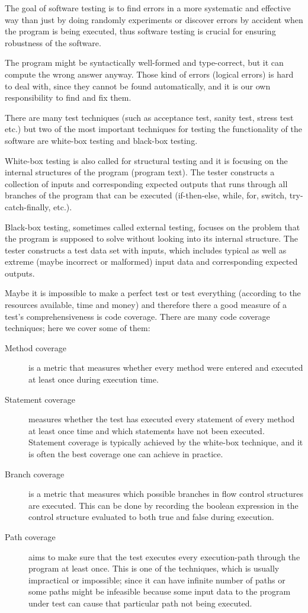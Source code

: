 \documentclass[10pt,a4paper]{article}
\begin{document}
The goal of software testing is to find errors in a more systematic and effective way than just by doing randomly experiments or discover errors by accident when the program is being executed, thus software testing is crucial for ensuring robustness of the software.
 
The program might be syntactically well-formed and type-correct, but it can compute the wrong answer anyway. Those kind of errors (logical errors) is hard to deal with, since they cannot be found automatically, and it is our own responsibility to find and fix them.

There are many test techniques (such as acceptance test, sanity test, stress test etc.) but two of the most important techniques for testing the functionality of the software are white-box testing and black-box testing.
 
White-box testing is also called for structural testing and it is focusing on the internal structures of the program (program text). The tester constructs a collection of inputs and corresponding expected outputs that runs through all branches of the program that can be executed (if-then-else, while, for, switch, try-catch-finally, etc.).
 
Black-box testing, sometimes called external testing, focuses on the problem that the program is supposed to solve without looking into its internal structure. The tester constructs a test data set with inputs, which includes typical as well as extreme (maybe incorrect or malformed) input data and corresponding expected outputs.
 
Maybe it is impossible to make a perfect test or test everything (according to the resources available, time and money) and therefore there a good measure of a test’s comprehensiveness is code coverage.
There are many code coverage techniques; here we cover some of them:

\begin{description}
 \item [Method coverage] is a metric that measures whether every method were entered and executed at least once during execution time.
 \item[Statement coverage] measures whether the test has executed every statement of every method at least once time and which statements have not been executed. Statement coverage is typically achieved by the white-box technique, and it is often the best coverage one can achieve in practice.
 \item [Branch coverage] is a metric that measures which possible branches in flow control structures are executed. This can be done by recording the boolean expression in the  control structure evaluated to both true and false during execution.
 \item[Path coverage] aims to make sure that the test executes every execution-path through the program at least once. This is one of the techniques, which is usually impractical or impossible; since it can have infinite number of paths or some paths might be infeasible because some input data to the program under test can cause that particular path not being executed.
\end{description} 
\end{document}
